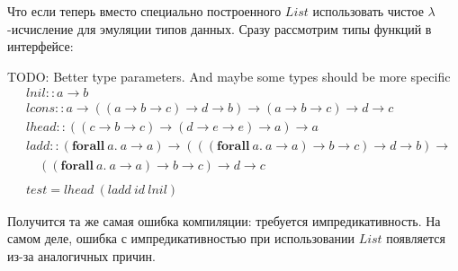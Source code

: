Что если теперь вместо специально построенного \(List\) использовать чистое
\(\lambda\)-исчисление для эмуляции типов данных. Сразу рассмотрим типы функций
в интерфейсе:

TODO: Better type parameters. And maybe some types should be more specific
\begin{align*}
&lnil :: a \rightarrow b\\
&lcons :: a \rightarrow ((a \rightarrow b \rightarrow c) \rightarrow d \rightarrow b)
   \rightarrow (a \rightarrow b \rightarrow c) \rightarrow d \rightarrow c\\
&lhead :: ((c \rightarrow b \rightarrow c) \rightarrow (d \rightarrow e \rightarrow e)
   \rightarrow a) \rightarrow a\\
&ladd :: (\mathbf{forall}\ a.\ a \rightarrow a) \rightarrow
   (((\mathbf{forall}\ a.\ a \rightarrow a) \rightarrow b \rightarrow c)
   \rightarrow d \rightarrow b) \rightarrow \\
&\quad((\mathbf{forall}\ a.\ a \rightarrow a) \rightarrow b \rightarrow c)
   \rightarrow d \rightarrow c\\
\\
&test = lhead\ (ladd\ id\ lnil)
\end{align*}

Получится та же самая ошибка компиляции: требуется импредикативность. На самом деле,
ошибка с импредикативностью при использовании \(List\) появляется из-за аналогичных причин.
